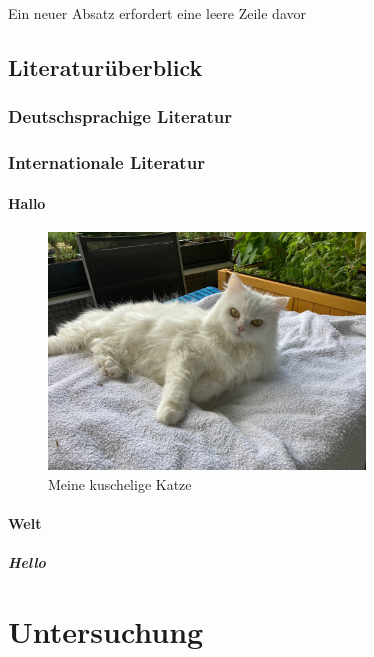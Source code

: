 \documentclass[12pt,parskip=half]{scrartcl}
\begin{document}
Ein neuer Absatz erfordert eine leere Zeile davor

\blindtext[5]

\subsection{Literaturüberblick}
\subsubsection{Deutschsprachige Literatur}

\blindtext[5]

\subsubsection{Internationale Literatur}

\blindtext[5]

\paragraph{Hallo} \blindtext[5]

\begin{figure}
\centering
\includegraphics[width=0.75\textwidth]{Bilder/Katze1}
\caption{Meine kuschelige Katze}\label{fig:katze1}
\end{figure}



\paragraph{Welt} \blindtext[5]

\subparagraph{Hello} \blindtext[5]


\section{Untersuchung}
\end{document}
